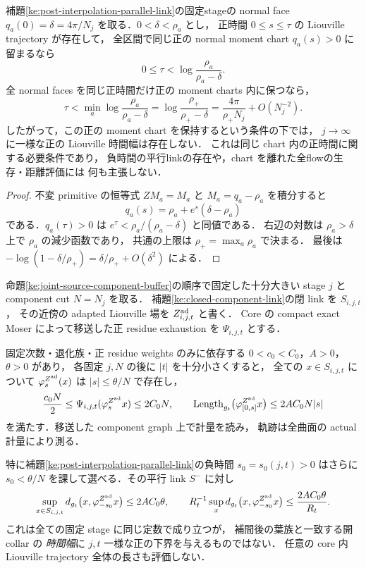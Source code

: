 \begin{lemma}
\label{ke:positive-normal-moment-time-ceiling}
補題\ref{ke:post-interpolation-parallel-link}の固定stageの normal face
\(q_a(0)=\delta=4\pi/N_j\) を取る．\(0<\delta<\rho_a\) とし，
正時間 \(0\le s\le\tau\) の Liouville trajectory が存在して，
全区間で同じ正の normal moment chart \(q_a(s)>0\) に留まるなら
\[
 0\le\tau<\log\frac{\rho_a}{\rho_a-\delta}.
\]
全 normal faces を同じ正時間だけ正の moment charts 内に保つなら，
\[
 \tau<\min_a\log\frac{\rho_a}{\rho_a-\delta}
 =\log\frac{\rho_+}{\rho_+-\delta}
 =\frac{4\pi}{\rho_+N_j}+O(N_j^{-2}).
\]
したがって，この正の moment chart を保持するという条件の下では，
\(j\to\infty\) に一様な正の Liouville 時間幅は存在しない．
これは同じ chart 内の正時間に関する必要条件であり，
負時間の平行linkの存在や，chart を離れた全flowの生存・距離評価には
何も主張しない．
\end{lemma}
\begin{proof}
不変 primitive の恒等式 \(ZM_a=M_a\) と
\(M_a=q_a-\rho_a\) を積分すると
\[
 q_a(s)=\rho_a+e^s(\delta-\rho_a)
\]
である．\(q_a(\tau)>0\) は
\(e^\tau<\rho_a/(\rho_a-\delta)\) と同値である．
右辺の対数は \(\rho_a>\delta\) 上で \(\rho_a\) の減少函数であり，
共通の上限は \(\rho_+=\max_a\rho_a\) で決まる．
最後は \(-\log(1-\delta/\rho_+)=\delta/\rho_++O(\delta^2)\)
による．
\end{proof}

\begin{lemma}
\label{ke:parallel-liouville-metric-cost}
命題\ref{ke:joint-source-component-buffer}の順序で固定した十分大きい
stage \(j\) と component cut \(N=N_j\) を取る．
補題\ref{ke:closed-component-link}の閉 link を \(S_{i,j,t}\)，
その近傍の adapted Liouville 場を \(Z_{i,j,t}^{\rm ad}\) と書く．
Core の compact exact Moser によって移送した正 residue
exhaustion を \(\Psi_{i,j,t}\) とする．

固定次数・退化族・正 residue weights のみに依存する
\(0<c_0<C_0\)，\(A>0\)，\(\theta>0\) があり，
各固定 \(j,N\) の後に \(\lvert t\rvert\) を十分小さくすると，
全ての \(x\in S_{i,j,t}\) について
\(\varphi_s^{Z^{\rm ad}}(x)\) は
\(\lvert s\rvert\le\theta/N\) で存在し，
\begin{equation}\label{ke:eq:parallel-liouville-shell-and-cost}
 \frac{c_0N}{2}
 \le\Psi_{i,j,t}(\varphi_s^{Z^{\rm ad}}x)\le2C_0N,
 \qquad
 \operatorname{Length}_{g_t}
 \bigl(\varphi_{[0,s]}^{Z^{\rm ad}}x\bigr)
 \le2AC_0N\lvert s\rvert
\end{equation}
を満たす．移送した component graph 上で計量を読み，
軌跡は全曲面の actual 計量により測る．

特に補題\ref{ke:post-interpolation-parallel-link}の負時間
\(s_0=s_0(j,t)>0\) はさらに
\(s_0<\theta/N\) を課して選べる．その平行 link \(S^-\) に対し
\[
 \sup_{x\in S_{i,j,t}}
 d_{g_t}\bigl(x,\varphi_{-s_0}^{Z^{\rm ad}}x\bigr)
 \le2AC_0\theta,\qquad
 R_t^{-1}\sup_xd_{g_t}
 \bigl(x,\varphi_{-s_0}^{Z^{\rm ad}}x\bigr)
 \le\frac{2AC_0\theta}{R_t}.
\]
これは全ての固定 stage に同じ定数で成り立つが，
補間後の葉族と一致する開 collar の \emph{時間幅}に
\(j,t\) 一様な正の下界を与えるものではない．
任意の core 内 Liouville trajectory 全体の長さも評価しない．
\end{lemma}

